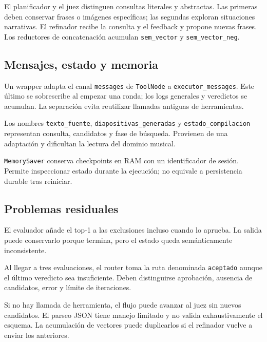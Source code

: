 \documentclass[11pt,a4paper]{article}
\newcommand{\code}[1]{\nolinkurl{#1}}
\begin{document}
El planificador y el juez distinguen consultas literales y abstractas. Las primeras deben conservar frases o imágenes específicas; las segundas exploran situaciones narrativas. El refinador recibe la consulta y el feedback y propone nuevas frases. Los reductores de concatenación acumulan \code{sem_vector} y \code{sem_vector_neg}.

\subsection{Mensajes, estado y memoria}
Un wrapper adapta el canal \code{messages} de \code{ToolNode} a \code{executor_messages}. Este último se sobrescribe al empezar una ronda; los logs generales y veredictos se acumulan. La separación evita reutilizar llamadas antiguas de herramientas.

Los nombres \code{texto_fuente}, \code{diapositivas_generadas} y \code{estado_compilacion} representan consulta, candidatos y fase de búsqueda. Provienen de una adaptación y dificultan la lectura del dominio musical.

\code{MemorySaver} conserva checkpoints en RAM con un identificador de sesión. Permite inspeccionar estado durante la ejecución; no equivale a persistencia durable tras reiniciar.

\subsection{Problemas residuales}
El evaluador añade el top-1 a las exclusiones incluso cuando lo aprueba. La salida puede conservarlo porque termina, pero el estado queda semánticamente inconsistente.

Al llegar a tres evaluaciones, el router toma la ruta denominada \code{aceptado} aunque el último veredicto sea insuficiente. Deben distinguirse aprobación, ausencia de candidatos, error y límite de iteraciones.

Si no hay llamada de herramienta, el flujo puede avanzar al juez sin nuevos candidatos. El parseo JSON tiene manejo limitado y no valida exhaustivamente el esquema. La acumulación de vectores puede duplicarlos si el refinador vuelve a enviar los anteriores.
\end{document}
